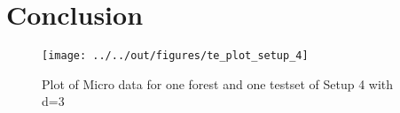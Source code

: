 \documentclass[11pt, a4paper, leqno]{article}
\begin{document}











\section{Conclusion} %
\label{sec:conclusion}

\begin{figure}
    \caption{Plot of Micro data for one forest and one testset of Setup 4 with d=3}
    
    \texttt{[image: ../../out/figures/te\_plot\_setup\_4]}

\end{figure}




\pagebreak










\end{document}
